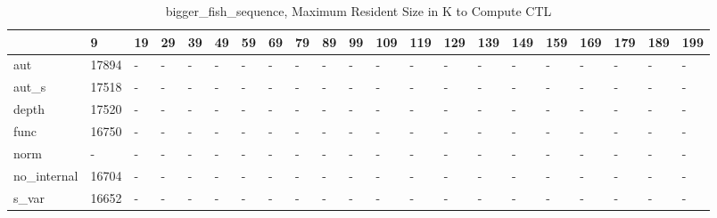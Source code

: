 \begin{table}
\caption{bigger_fish_sequence, Maximum Resident Size in K to Compute CTL}
\label{bigger_fish_sequence_CTL_size}
\begin{tabular}{lllllllllllllllllllll}
\toprule
 & 9 & 19 & 29 & 39 & 49 & 59 & 69 & 79 & 89 & 99 & 109 & 119 & 129 & 139 & 149 & 159 & 169 & 179 & 189 & 199 \\
\midrule
aut & 17894 & - & - & - & - & - & - & - & - & - & - & - & - & - & - & - & - & - & - & - \\
aut_s & 17518 & - & - & - & - & - & - & - & - & - & - & - & - & - & - & - & - & - & - & - \\
depth & 17520 & - & - & - & - & - & - & - & - & - & - & - & - & - & - & - & - & - & - & - \\
func & 16750 & - & - & - & - & - & - & - & - & - & - & - & - & - & - & - & - & - & - & - \\
norm & - & - & - & - & - & - & - & - & - & - & - & - & - & - & - & - & - & - & - & - \\
no_internal & 16704 & - & - & - & - & - & - & - & - & - & - & - & - & - & - & - & - & - & - & - \\
s_var & 16652 & - & - & - & - & - & - & - & - & - & - & - & - & - & - & - & - & - & - & - \\
\bottomrule
\end{tabular}
\end{table}
